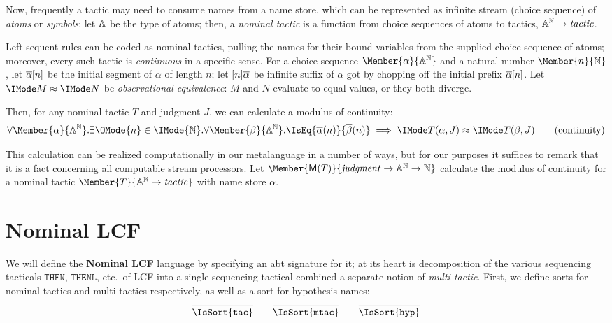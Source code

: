 Now, frequently a tactic may need to consume names from a name store, which can
be represented as infinite stream (choice sequence) of \emph{atoms} or
\emph{symbols}; let $\mathbb{A}$ be the type of atoms; then, a \emph{nominal
tactic} is a function from choice sequences of atoms to tactics, ${\mathbb{A}}^{\mathbb{N}}\to\mathit{tactic}$.

Left sequent rules can be coded as nominal tactics, pulling the names for their bound
variables from the supplied choice sequence of atoms; moreover, every such tactic
is \emph{continuous} in a specific sense. For a choice sequence
$\Member{\alpha}{\MLStream{\MLAtom}}$ and a natural number
$\Member{n}{\MLNat}$, let $\protect\overline{\alpha}[n]$ be the initial segment of
$\alpha$ of length $n$; let $[n]\protect\overline{\alpha}$ be infinite suffix of
$\alpha$ got by chopping off the initial prefix $\protect\overline{\alpha}[n]$. Let
$\KleeneEq{M}{N}$ be \emph{observational equivalence}: $M$ and $N$ evaluate to
equal values, or they both diverge.

Then, for any nominal tactic $T$ and judgment $J$, we can calculate a
modulus of continuity:
\begin{equation}
  \forall \Member{\alpha}{\MLStream{\MLAtom}}.
  \exists \OMode{n}\in\IMode{\MLNat}.
  \forall \Member{\beta}{\MLStream{\MLAtom}}.
    \IsEq{\bar{\alpha}(n)}{\bar{\beta}(n)}\implies \KleeneEq{T(\alpha,J)}{T(\beta,J)}
  \tag{continuity}
\end{equation}

This calculation can be realized computationally in our metalanguage in a
number of ways, but for our purposes it suffices to remark that it is a fact
concerning all computable stream processors. Let
$\Member{\ModC{T}}{\LCFJudgment\to\MLStream{\MLAtom}\to\MLNat}$ calculate the
modulus of continuity for a nominal tactic $\Member{T}{\LCFNominalTactic}$ with
name store $\alpha$.

\section{Nominal LCF}

\newcommand\SortTac{\mathtt{tac}}
\newcommand\SortMTac{\mathtt{mtac}}
\newcommand\SortHyp{\mathtt{hyp}}

We will define the \textbf{Nominal LCF} language by specifying an abt signature
for it; at its heart is decomposition of the various sequencing tacticals
$\mathtt{THEN}$, $\mathtt{THENL}$, etc.\ of LCF into a single sequencing
tactical combined a separate notion of \emph{multi-tactic}.
First, we define sorts for nominal tactics and multi-tactics respectively, as
well as a sort for hypothesis names:
\[
  \infer{
    \IsSort{\SortTac}
  }{}
  \qquad
  \infer{
    \IsSort{\SortMTac}
  }{}
  \qquad
  \infer{
    \IsSort{\SortHyp}
  }{
  }
\]

